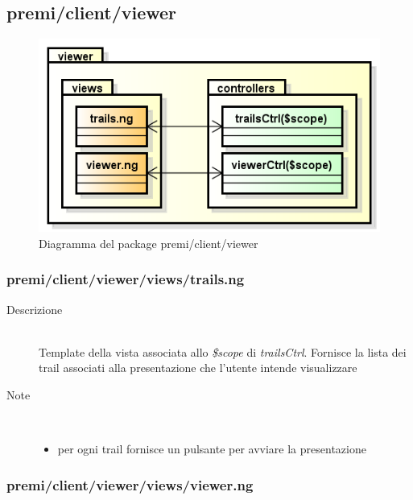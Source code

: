 \clearpage
\subsection{premi/client/viewer}
\begin{figure}[h]
\begin{center}
\includegraphics[scale=0.55]{img/diapkg/viewer.png}
\caption{Diagramma del package premi/client/viewer}
\end{center}
\end{figure}


\subsubsection{premi/client/viewer/views/trails.ng}

\begin{description}
\item[Descrizione] \hfill \\
	Template della vista associata allo \textit{\$scope} di \textit{trailsCtrl}. Fornisce la lista dei trail associati alla presentazione che l'utente intende visualizzare
\item[Note] \hfill \\
	\begin{itemize}
			\item per ogni trail fornisce un pulsante per avviare la presentazione
	\end{itemize}
\end{description}

\subsubsection{premi/client/viewer/views/viewer.ng}

